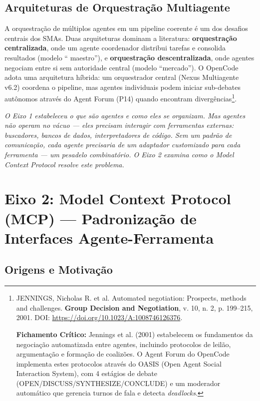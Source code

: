 \subsection{Arquiteturas de Orquestração Multiagente}

A orquestração de múltiplos agentes em um pipeline coerente é um dos desafios centrais dos SMAs. Duas arquiteturas dominam a literatura: \textbf{orquestração centralizada}, onde um agente coordenador distribui tarefas e consolida resultados (modelo `` maestro''), e \textbf{orquestração descentralizada}, onde agentes negociam entre si sem autoridade central (modelo ``mercado''). O OpenCode adota uma arquitetura híbrida: um orquestrador central (Nexus Multiagente v6.2) coordena o pipeline, mas agentes individuais podem iniciar sub-debates autônomos através do Agent Forum (P14) quando encontram divergências\footnote{
  JENNINGS, Nicholas R. et al. Automated negotiation: Prospects, methods and challenges. \textbf{Group Decision and Negotiation}, v. 10, n. 2, p. 199--215, 2001. DOI: \url{https://doi.org/10.1023/A:1008746126376}.

  \textbf{Fichamento Crítico:} Jennings et al. (2001) estabelecem os fundamentos da negociação automatizada entre agentes, incluindo protocolos de leilão, argumentação e formação de coalizões. O Agent Forum do OpenCode implementa estes protocolos através do OASIS (Open Agent Social Interaction System), com 4 estágios de debate (OPEN/DISCUSS/SYNTHESIZE/CONCLUDE) e um moderador automático que gerencia turnos de fala e detecta \textit{deadlocks}.
}.

{\small\itshape O Eixo 1 estabeleceu o que são agentes e como eles se organizam. Mas agentes não operam no vácuo — eles precisam interagir com ferramentas externas: buscadores, bancos de dados, interpretadores de código. Sem um padrão de comunicação, cada agente precisaria de um adaptador customizado para cada ferramenta — um pesadelo combinatório. O Eixo 2 examina como o Model Context Protocol resolve este problema.}

\section{Eixo 2: Model Context Protocol (MCP) — Padronização de Interfaces Agente-Ferramenta}

\subsection{Origens e Motivação}

